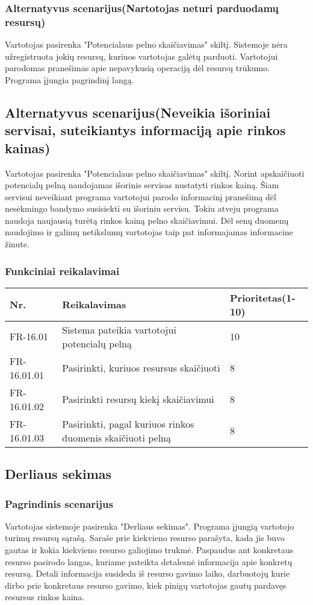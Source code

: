 \documentclass[oneside]{VUMIFPSkursinis}
\begin{document}
	\subsubsection{Alternatyvus scenarijus(Nartotojas neturi parduodamų resursų)}
	Vartotojas pasirenka "Potencialaus pelno skaičiavimas" skiltį. Sistemoje nėra užregistruota jokių resursų, kuriuos vartotojas galėtų parduoti. Vartotojui parodomas pranešimas apie nepavykusią operaciją dėl resursų trūkumo. Programa įjungia pagrindinį langą. 
	\subsection{Alternatyvus scenarijus(Neveikia išoriniai servisai, suteikiantys informaciją apie rinkos kainas)}
	Vartotojas pasirenka "Potencialaus pelno skaičiavimas" skiltį. Norint apskaičiuoti potencialų pelną naudojamas išorinis servisas nustatyti rinkos kainą. Šiam servisui neveikiant programa vartotojui parodo informacinį pranešimą dėl nesėkmingo bandymo susisiekti su išoriniu servisu. Tokiu atveju programa naudoja naujausią turėtą rinkos kainą pelno skaičiavimui. Dėl senų duomenų naudojimo ir galimų netikslumų vartotojas taip pat informajamas informacine žinute.
	\subsubsection{Funkciniai reikalavimai}
\begin{table}[htbp]
	\begin{tabularx}{1\textwidth}{ |P{2.5cm}|X|P{3cm }| }  \hline
		Nr. & Reikalavimas & Prioritetas(1-10) \\ \hline
		FR-16.01 & Sistema pateikia vartotojui potencialų pelną & 10 \\ \hline
		FR-16.01.01 & Pasirinkti, kuriuos resursus skaičiuoti & 8 \\ \hline
		FR-16.01.02 & Pasirinkti resursų kiekį skaičiavimui & 8 \\ \hline
		FR-16.01.03 & Pasirinkti, pagal kuriuos rinkos duomenis skaičiuoti pelną & 8 \\ \hline
	\end{tabularx}
\end{table}	
\subsection{Derliaus sekimas}
	\subsubsection{Pagrindinis scenarijus}
	Vartotojas sistemoje pasirenka "Derliaus sekimas". Programa įjungią vartotojo turimų resursų sąrašą. Saraše prie kiekvieno resurso parašyta, kada jis buvo gautas ir kokia kiekvieno resurso galiojimo trukmė. Paspaudus ant konkretaus resurso pasirodo langas, kuriame pateikta detalesnė informacija apie konkretų resursą. Detali informacija susideda iš resurso gavimo laiko, darbuotojų kurie dirbo prie konkretaus resurso gavimo, kiek pinigų vartotojas gautų pardavęs resursus rinkos kaina.
\end{document}
